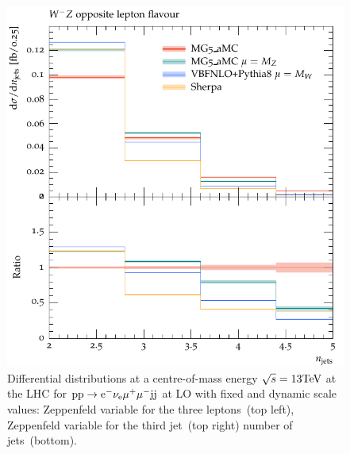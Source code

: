 \begin{figure}[htbp]
\begin{center}
   \includegraphics[scale=0.65]{figs/WmZ_OF_nJets}
\caption{Differential distributions at a centre-of-mass energy $\sqrt{s}=13{\rm TeV}$ at the LHC for ${\rm p} {\rm p} \to {\rm e}^-  \nu_{\rm e}  \mu^+ \mu^- {\rm j} {\rm j}$ at LO with fixed and dynamic scale values: 
                Zeppenfeld variable for the three leptons~(top left),
                Zeppenfeld variable for the third jet~(top right)
                number of jets~(bottom).}
\label{vbs_fig_shower_3b}
\end{center}
\end{figure}

